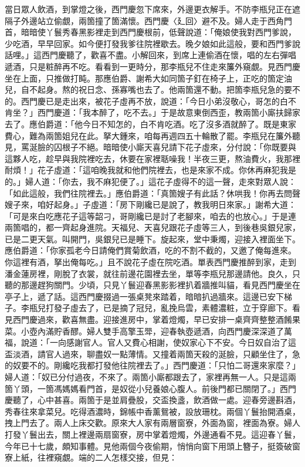 當日眾人飲酒，到掌燈之後，西門慶忽下席來，外邊更衣解手。不防李瓶兒正在遮隔子外邊站立偷覷，兩箇撞了箇滿懷。西門慶〈廴回〉避不及。婦人走于西角門首，暗暗使丫鬟秀春黑影裡走到西門慶根前，低聲說道：「俺娘使我對西門爹說，少吃酒，早早回家。如今便打發我爹往院裡歇去。晚夕娘如此這般，要和西門爹說話哩。」這西門慶聽了，歡喜不盡。小解回來，到席上連偷酒在懷，唱的左右彈唱遞酒，只是粧醉再不吃。看看到一更時分，那李瓶兒不住走來簾外窺覷。見西門慶坐在上面，只推做打盹。那應伯爵、謝希大如同箇子釘在椅子上，正吃的箇定油兒，自不起身。熬的祝日念、孫寡嘴也去了。他兩箇還不動。把箇李瓶兒急的要不的。西門慶已是走出來，被花子虛再不放，說道：「今日小弟沒敬心，哥怎的白不肯坐？」西門慶道：「我本醉了，吃不去。」于是故意東倒西歪，教兩箇小廝扶歸家去了。應伯爵道：「他今日不知怎的，白不肯吃酒。吃了沒多酒就醉了。既是東家費心，難為兩箇姐兒在此。拏大鍾來，咱每再週四五十輪散了罷。李瓶兒在簾外聽見，罵涎臉的囚根子不絕。暗暗使小廝天喜兒請下花子虛來，分付說：「你既要與這夥人吃，趁早與我院裡吃去，休要在家裡聒噪我！半夜三更，熬油費火，我那裡耐煩！」花子虛道：「這咱晚我就和他們院裡去，也是來家不成。你休再麻犯我是的。」婦人道：「你去，我不麻犯便了。」這花子虛得不的這一聲，走來對眾人說：「如此這般，我們往院裡去。」應伯爵道：「真箇嫂子有此話？休哄我！你再去問聲嫂子來，咱好起身。」子虛道：「房下剛纔已是說了，教我明日來家。」謝希大道：「可是來白吃應花子這等韶刁，哥剛纔已是討了老腳來，咱去的也放心。」于是連兩箇唱的，都一齊起身進院。天福兒、天喜兒跟花子虛等三人，到後巷吳銀兒家，已是二更天氣。叫開門，吳銀兒已是睡下。旋起來，堂中秉燭，迎接入裡面坐下。應伯爵道：「你家孤老今日請俺們賞菊飲酒，吃的不割不截的，又邀了俺每進來。你這裡有酒，拏出俺每吃。」且不說花子虛在院吃酒。單表西門慶推醉到家，走到潘金蓮房裡，剛脫了衣裳，就往前邊花園裡去坐，單等李瓶兒那邊請他。良久，只聽的那邊趕狗關門。少頃，只見丫鬟迎春黑影影裡扒着牆推叫貓，看見西門慶坐在亭子上，遞了話。這西門慶掇過一張桌凳來踏着，暗暗扒過牆來。這邊已安下梯子。李瓶兒打發子虛去了，已是摘了冠兒，亂挽烏雲，素體濃粧，立于穿廊下。看見西門慶過來，歡喜無盡。迎接進房中，掌着燈燭，早已安排一桌齊齊整整酒餚果菜。小壺內滿貯香醪。婦人雙手高擎玉斝，迎春執壺遞酒，向西門慶深深道了萬福，說道：「一向感謝官人。官人又費心相謝，使奴家心下不安。今日奴自治了這盃淡酒，請官人過來，聊盡奴一點薄情。又撞着兩箇天殺的涎臉，只顧坐住了，急的奴要不的。剛纔吃我都打發他往院裡去了。」西門慶道：「只怕二哥還來家麼？」婦人道：「奴已分付過夜，不來了。兩箇小廝都跟去了，家裡再無一人。只是這兩箇丫頭，一箇馮媽媽看門首，是奴從小兒養娘心腹人。前後門都已關閉了。」西門慶聽了，心中甚喜。兩箇于是並肩疊股，交盃換盞，飲酒做一處。迎春旁邊斟酒，秀春往來拿菜兒。吃得酒濃時，錦帳中香薰鴛被，設放珊枕。兩個丫鬟抬開酒桌，拽上門去了。兩人上床交歡。原來大人家有兩層窗寮，外面為窗，裡面為寮。婦人打發丫鬟出去，關上裡邊兩扇窗寮，房中掌着燈燭，外邊通看不見。這迎春丫鬟，今年已十七歲，頗知事體。見他兩個今夜偷期，悄悄向窗下用頭上簪子，挺簽破窗寮上紙，往裡窺覷。端的二人怎樣交接，但見：

